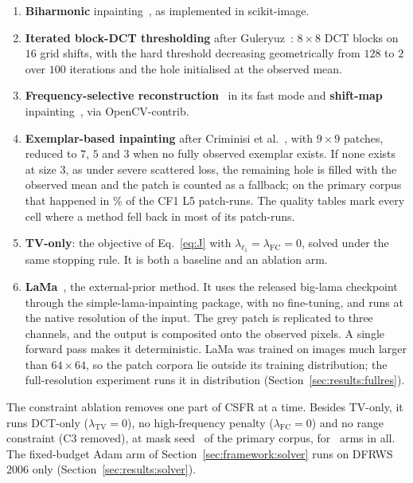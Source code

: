 \documentclass[final,3p]{elsarticle}
\begin{document}
\begin{enumerate}
  \item \textbf{Biharmonic} inpainting~\cite{damelin2018surface}, as implemented in scikit-image.
  \item \textbf{Iterated block-DCT thresholding} after Guleryuz~\cite{guleryuz2006nonlinear}: $8 \times 8$ DCT blocks on $16$ grid shifts, with the hard threshold decreasing geometrically from $128$ to $2$ over $100$ iterations and the hole initialised at the observed mean.
  \item \textbf{Frequency-selective reconstruction}~\cite{seiler2015resampling} in its fast mode and \textbf{shift-map} inpainting~\cite{pritch2009shift}, via OpenCV-contrib.
  \item \textbf{Exemplar-based inpainting} after Criminisi et al.~\cite{criminisi2004region}, with $9 \times 9$ patches, reduced to $7$, $5$ and $3$ when no fully observed exemplar exists. If none exists at size $3$, as under severe scattered loss, the remaining hole is filled with the observed mean and the patch is counted as a fallback; on the primary corpus that happened in \fallbackExemplarCFoneLfive\% of the CF1 L5 patch-runs. The quality tables mark every cell where a method fell back in most of its patch-runs.
  \item \textbf{TV-only}: the objective of Eq.~\eqref{eq:J} with $\lambda_{\ell_1} = \lambda_{\mathrm{FC}} = 0$, solved under the same stopping rule. It is both a baseline and an ablation arm.
  \item \textbf{LaMa}~\cite{suvorov2022resolution}, the external-prior method. It uses the released big-lama checkpoint through the simple-lama-inpainting package, with no fine-tuning, and runs at the native resolution of the input. The grey patch is replicated to three channels, and the output is composited onto the observed pixels. A single forward pass makes it deterministic. LaMa was trained on images much larger than $64 \times 64$, so the patch corpora lie outside its training distribution; the full-resolution experiment runs it in distribution (Section~\ref{sec:results:fullres}).
\end{enumerate}
The constraint ablation removes one part of CSFR at a time. Besides TV-only, it runs DCT-only ($\lambda_{\mathrm{TV}} = 0$), no high-frequency penalty ($\lambda_{\mathrm{FC}} = 0$) and no range constraint (C3 removed), at mask seed \sweepAblationSeeds\ of the primary corpus, for \methodsAblation\ arms in all. The fixed-budget Adam arm of Section~\ref{sec:framework:solver} runs on DFRWS 2006 only (Section~\ref{sec:results:solver}).
\end{document}
